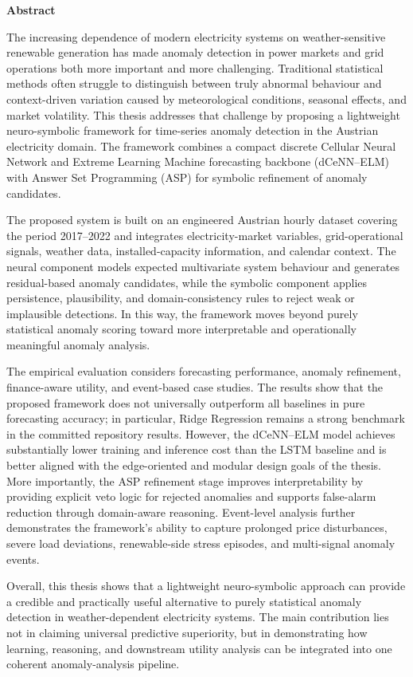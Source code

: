 {\Large
	\noindent
	{\bf Abstract}} \\
\vspace*{0.3 cm}

\noindent
The increasing dependence of modern electricity systems on weather-sensitive renewable generation has made anomaly detection in power markets and grid operations both more important and more challenging. Traditional statistical methods often struggle to distinguish between truly abnormal behaviour and context-driven variation caused by meteorological conditions, seasonal effects, and market volatility. This thesis addresses that challenge by proposing a lightweight neuro-symbolic framework for time-series anomaly detection in the Austrian electricity domain. The framework combines a compact discrete Cellular Neural Network and Extreme Learning Machine forecasting backbone (dCeNN--ELM) with Answer Set Programming (ASP) for symbolic refinement of anomaly candidates.

The proposed system is built on an engineered Austrian hourly dataset covering the period 2017--2022 and integrates electricity-market variables, grid-operational signals, weather data, installed-capacity information, and calendar context. The neural component models expected multivariate system behaviour and generates residual-based anomaly candidates, while the symbolic component applies persistence, plausibility, and domain-consistency rules to reject weak or implausible detections. In this way, the framework moves beyond purely statistical anomaly scoring toward more interpretable and operationally meaningful anomaly analysis.

The empirical evaluation considers forecasting performance, anomaly refinement, finance-aware utility, and event-based case studies. The results show that the proposed framework does not universally outperform all baselines in pure forecasting accuracy; in particular, Ridge Regression remains a strong benchmark in the committed repository results. However, the dCeNN--ELM model achieves substantially lower training and inference cost than the LSTM baseline and is better aligned with the edge-oriented and modular design goals of the thesis. More importantly, the ASP refinement stage improves interpretability by providing explicit veto logic for rejected anomalies and supports false-alarm reduction through domain-aware reasoning. Event-level analysis further demonstrates the framework’s ability to capture prolonged price disturbances, severe load deviations, renewable-side stress episodes, and multi-signal anomaly events.

Overall, this thesis shows that a lightweight neuro-symbolic approach can provide a credible and practically useful alternative to purely statistical anomaly detection in weather-dependent electricity systems. The main contribution lies not in claiming universal predictive superiority, but in demonstrating how learning, reasoning, and downstream utility analysis can be integrated into one coherent anomaly-analysis pipeline.